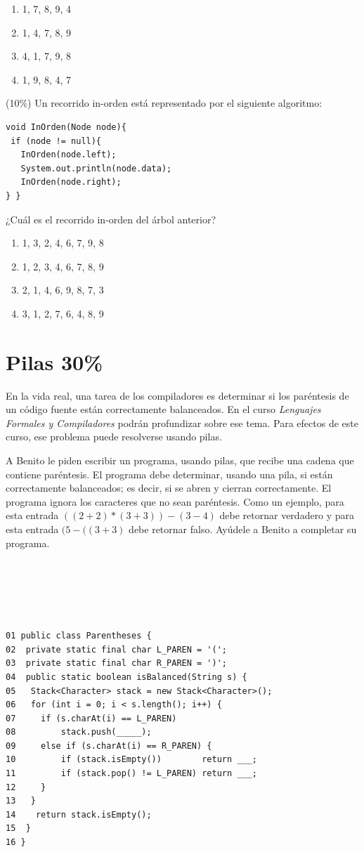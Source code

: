 \documentclass[twocolumn]{article}
\begin{document}
\begin{enumerate}[label=\Alph*]
\item 1, 7, 8, 9, 4
\item 1, 4, 7, 8, 9
\item 4, 1, 7, 9, 8
\item 1, 9, 8, 4, 7 \\
\end{enumerate}

(10\%) Un recorrido in-orden está representado por el siguiente
algoritmo:

\begin{verbatim}
void InOrden(Node node){
 if (node != null){
   InOrden(node.left);
   System.out.println(node.data);
   InOrden(node.right);
} }
\end{verbatim}

¿Cuál es el recorrido in-orden del árbol anterior?
\begin{enumerate}[label=\Alph*]
\item 1, 3, 2, 4, 6, 7, 9, 8
\item 1, 2, 3, 4, 6, 7, 8, 9
\item 2, 1, 4, 6, 9, 8, 7, 3
\item 3, 1, 2, 7, 6, 4, 8, 9
\end{enumerate}



\section{Pilas 30\%}

En la vida real, una tarea de los compiladores es determinar si los paréntesis de un
código fuente están correctamente balanceados. En el curso \emph{Lenguajes Formales y Compiladores} podrán
profundizar sobre ese tema. Para efectos de este curso, ese problema puede resolverse usando pilas.

A Benito le piden escribir un programa, usando pilas, que recibe una cadena que contiene paréntesis. El programa debe determinar, usando una pila, si están correctamente balanceados;
es decir, si se abren y cierran correctamente. El programa ignora los caracteres que no sean paréntesis. Como un ejemplo, para esta entrada $((2+2)*(3+3))-(3-4)$ debe retornar verdadero y 
para esta entrada $(5-((3+3)$ debe retornar falso. Ayúdele a Benito a completar su programa.

{\small
\begin{verbatim}





01 public class Parentheses {
02  private static final char L_PAREN = '(';
03  private static final char R_PAREN = ')';
04  public static boolean isBalanced(String s) {
05   Stack<Character> stack = new Stack<Character>();
06   for (int i = 0; i < s.length(); i++) {
07     if (s.charAt(i) == L_PAREN)   
08         stack.push(_____);
09     else if (s.charAt(i) == R_PAREN) {
10         if (stack.isEmpty())        return ___;
11         if (stack.pop() != L_PAREN) return ___;
12     }
13   }
14    return stack.isEmpty();
15  }
16 }
\end{verbatim}
}
\end{document}
